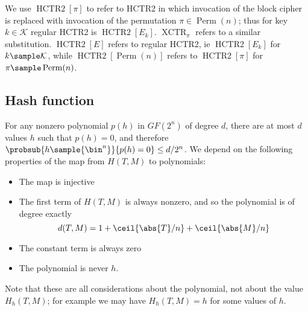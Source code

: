 \documentclass[letterpaper,11pt]{article}
\DeclareMathOperator{\HCTR}{HCTR2}
\DeclareMathOperator{\Perm}{Perm}
\DeclareMathOperator{\XCTR}{XCTR}
\begin{document}
We use \(\HCTR[\pi]\) to refer to HCTR2 in which invocation
of the block cipher is replaced with invocation of the
permutation \(\pi \in \Perm(n)\); thus for key
\(k \in \mathcal{K}\) regular HCTR2 is \(\HCTR[E_k]\).
\(\XCTR_\pi\) refers to a similar substitution.
\(\HCTR[E]\) refers to regular HCTR2,
ie \(\HCTR[E_k]\) for \(k \sample \mathcal{K}\), while
\(\HCTR[\Perm(n)]\) refers to \(\HCTR[\pi]\)
for \(\pi \sample \Perm(n)\).

\subsection{Hash function}
For any nonzero polynomial \(p(h)\)
in \(GF(2^n)\) 
of degree \(d\), there are at most \(d\) values \(h\)
such that \(p(h) = 0\), and therefore
\(\probsub{h\sample{\bin^n}}{p(h) = 0} \leq d/2^n\).
We depend on the following properties of the map from 
\(H(T, M)\) to polynomials:
\begin{itemize}
    \item The map is injective
    \item The first term of \(H(T, M)\) is always nonzero,
    and so the polynomial is of degree exactly
    \begin{displaymath}
        d(T, M) = 1 + \ceil{\abs{T}/n} + \ceil{\abs{M}/n}
    \end{displaymath}
    \item The constant term is always zero
    \item The polynomial is never \(h\).
\end{itemize}
Note that these are all considerations about the polynomial,
not about the value \(H_h(T, M)\);
for example we may have \(H_h(T, M) = h\) for some values of \(h\).
\end{document}
